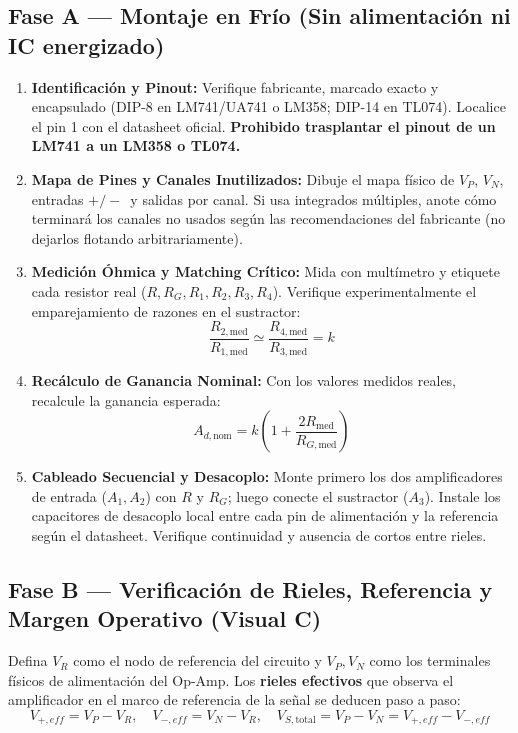 \documentclass[11pt, a4paper]{article}
\begin{document}
\subsection*{Fase A — Montaje en Frío (Sin alimentación ni IC energizado)}
\begin{enumerate}
    \setlength{\itemsep}{1pt}
    \item \textbf{Identificación y Pinout:} Verifique fabricante, marcado exacto y encapsulado (DIP-8 en LM741/UA741 o LM358; DIP-14 en TL074). Localice el pin 1 con el datasheet oficial. \textbf{Prohibido trasplantar el pinout de un LM741 a un LM358 o TL074.}
    \item \textbf{Mapa de Pines y Canales Inutilizados:} Dibuje el mapa físico de $V_P$, $V_N$, entradas $+/-\,$ y salidas por canal. Si usa integrados múltiples, anote cómo terminará los canales no usados según las recomendaciones del fabricante (no dejarlos flotando arbitrariamente).
    \item \textbf{Medición Óhmica y Matching Crítico:} Mida con multímetro y etiquete cada resistor real ($R, R_G, R_1, R_2, R_3, R_4$). Verifique experimentalmente el emparejamiento de razones en el sustractor:
    \begin{equation*}
        \frac{R_{2,\mathrm{med}}}{R_{1,\mathrm{med}}} \simeq \frac{R_{4,\mathrm{med}}}{R_{3,\mathrm{med}}} = k
    \end{equation*}
    \item \textbf{Recálculo de Ganancia Nominal:} Con los valores medidos reales, recalcule la ganancia esperada:
    \begin{equation*}
        A_{d,\mathrm{nom}} = k\left(1 + \frac{2R_{\mathrm{med}}}{R_{G,\mathrm{med}}}\right)
    \end{equation*}
    \item \textbf{Cableado Secuencial y Desacoplo:} Monte primero los dos amplificadores de entrada ($A_1, A_2$) con $R$ y $R_G$; luego conecte el sustractor ($A_3$). Instale los capacitores de desacoplo local entre cada pin de alimentación y la referencia según el datasheet. Verifique continuidad y ausencia de cortos entre rieles.
\end{enumerate}

\subsection*{Fase B — Verificación de Rieles, Referencia y Margen Operativo (Visual C)}
Defina $V_R$ como el nodo de referencia del circuito y $V_P, V_N$ como los terminales físicos de alimentación del Op-Amp. Los \textbf{rieles efectivos} que observa el amplificador en el marco de referencia de la señal se deducen paso a paso:
\begin{equation}
    V_{+,eff} = V_P - V_R, \quad V_{-,eff} = V_N - V_R, \quad V_{S,\mathrm{total}} = V_P - V_N = V_{+,eff} - V_{-,eff}
\end{equation}
\end{document}
